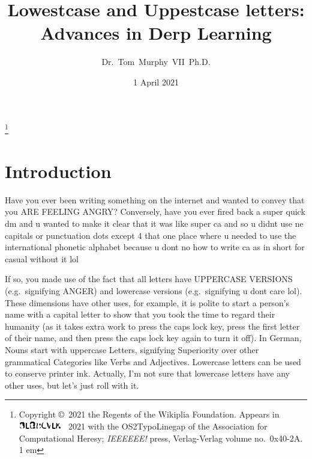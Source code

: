 \documentclass[twocolumn]{article}
\newcommand\upsigbovik{
  \includegraphics[height=1em]{upsigbovik}
}
\begin{document}
\title{Lowestcase and Uppestcase letters: Advances in Derp Learning}
\author{Dr.~Tom~Murphy~VII~Ph.D.}\thanks{
Copyright \copyright\ 2021 the Regents of the Wikiplia Foundation.
Appears in \upsigbovik~2021 with the
OS2TypoLinegap of the Association for Computational Heresy; {\em IEEEEEE!}
press, Verlag-Verlag volume no.~0x40-2A. 1 em}


\newcommand\makelowercase{{\sf make\_lowercase}}
\newcommand\makeuppercase{{\sf make\_uppercase}}

\renewcommand\th{\ensuremath{{}^{\textrm{th}}}}
\newcommand\st{\ensuremath{{}^{\textrm{st}}}}
\newcommand\rd{\ensuremath{{}^{\textrm{rd}}}}
\newcommand\nd{\ensuremath{{}^{\textrm{nd}}}}
\newcommand\at{\ensuremath{\scriptstyle @}}

\renewcommand\paragraph[1]{\smallskip \noindent{\bf #1}\enspace}

\date{1 April 2021}

\maketitle \thispagestyle{empty}

\sloppypar


\section{Introduction}

Have you ever been writing something on the internet and wanted to convey
that you ARE FEELING ANGRY? Conversely, have you ever fired back a super
quick dm and u wanted to make it clear that it was like super ca
and so u didnt use ne capitals or punctuation dots except 4 that one place
where u needed to use the international phonetic alphabet because u dont
no how to write ca as in short for casual without it lol

If so, you made use of the fact that all letters have UPPERCASE
VERSIONS (e.g.~signifying ANGER) and lowercase versions
(e.g.~signifying u dont care lol). These dimensions have other uses,
for example, it is polite to start a person's name with a capital
letter to show that you took the time to regard their humanity (as it
takes extra work to press the caps lock key, press the first letter of
their name, and then press the caps lock key again to turn it off).
In German, Nouns start with uppercase Letters, signifying Superiority
over other grammatical Categories like Verbs and Adjectives. Lowercase
letters can be used to conserve printer ink. Actually, I'm not sure that
lowercase letters have any other uses, but let's just roll with it.
\end{document}
